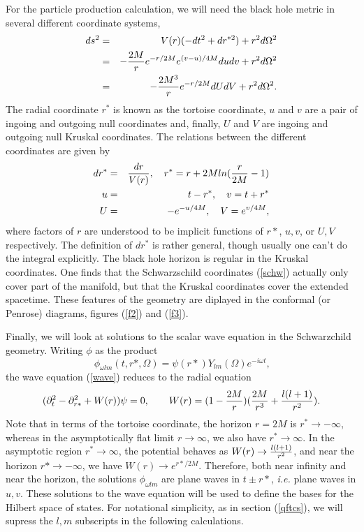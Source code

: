 \documentclass[12pt]{article}
\newcommand{\be}{\begin{equation}}
\newcommand{\ee}{\end{equation}}
\def\bena{\begin{eqnarray}}
\def\eena{\end{eqnarray}}
\begin{document}
For the particle production calculation, we will need the black hole metric
in several
different coordinate systems,
%
\bena\label{other} ds^2 &= &V(r)( -dt^2 + dr^{*2} ) + r^2 d\Omega ^2 \\
&=& -{2M\over r} e^{-r/2M} e^{(v-u)/4M} dudv    +r^2 d\Omega ^2 \\
& =& -{2M^3 \over r} e^{-r/2M}dU dV  +r^2 d\Omega ^2.\eena
%
The radial coordinate $r^*$ is known as the tortoise coordinate, $u$ and
$v$ are a
pair of ingoing and outgoing null coordinates and, finally, $U$ and $V$ are
ingoing and
outgoing null Kruskal coordinates.  The relations between the different
coordinates are
given by
%
\bena\label{coordtrans}
 dr^* &=& {dr\over V(r) },\quad r^*=r +2M ln ({r\over 2M}-1) \\
u &= &t-r^* ,\quad v=t+r^* \\
U &= &-e^{-u/4M} ,\quad  V=e^{v/4M} ,\eena
%
where factors of $r$ are understood to be implicit functions of $r*$,
$u,v$, or $U,V$ respectively. The definition of $dr^*$ is rather general,
though usually
one can't do the integral explicitly.
The black hole horizon is regular in the  Kruskal coordinates.
One finds that the Schwarzschild  coordinates (\ref{schw}) actually only
cover part of the
manifold, but that the Kruskal coordinates cover the extended  spacetime.
These features of the geometry are diplayed in the conformal (or Penrose)
diagrams, figures (\ref{f2}) and (\ref{f3}).

Finally, we will look at solutions to the scalar wave equation in the
Schwarzchild geometry.  Writing $\phi$ as the product
%
\be\label{separate}\,\phi _{\omega lm} (t,r*,\Omega )=\psi (r*) Y_{lm}(\Omega)
e^{-i\omega t},\ee
%
the wave equation (\ref{wave})  reduces to the radial equation
%
\be\label{waveschw} (\partial ^2 _t  -\partial ^2 _{r*} +W(r) )\psi =0,
\qquad W(r) =(1- {2M\over r}) ({2M\over r^3 } +{l(l+1)\over r^2} ).\ee
%
Note that in terms of the tortoise coordinate, the horizon $r=2M$ is
$r^*\rightarrow
-\infty$, whereas in the asymptotically flat limit $r\rightarrow\infty$, we
also have
$r^*\rightarrow\infty$.
In the asymptotic region $r^*\rightarrow\infty$, the potential behaves as
$W(r)\rightarrow
{l(l+1)\over r^2}$, and near the horizon $r*\rightarrow -\infty$, we have
$W(r)\rightarrow e^{r*/2M}$.  Therefore, both near infinity and near the
horizon, the
solutions $\phi _{\omega lm}$ are plane waves in $t\pm r*$, {\it i.e.}
plane waves in $u,v$.
These solutions to the wave equation will be used to define the bases for
the Hilbert
space of states. For notational simplicity, as in section (\ref{qftcs}), we will
supress the $l,m$
subscripts in the following calculations.
\end{document}
